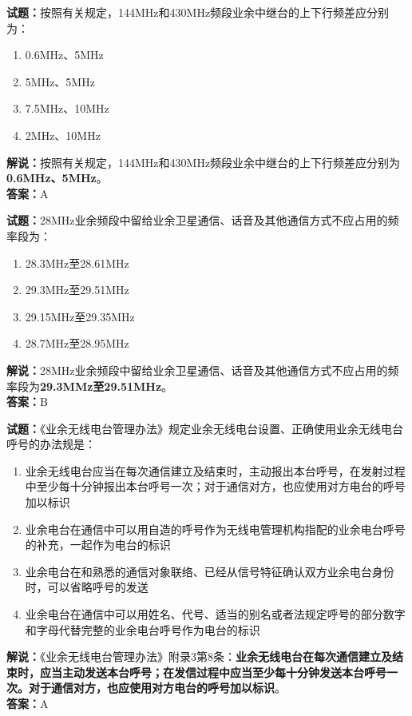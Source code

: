 \documentclass{ctexbook}
\begin{document}
\bigskip


\noindent\textbf{试题：}按照有关规定，144\unit{\MHz}和430\unit{\MHz}频段业余中继台的上下行频差应分别为：
\begin{enumerate}[leftmargin=3em]
\item 0.6\unit{\MHz}、5\unit{\MHz}%
\item 5\unit{\MHz}、5\unit{\MHz}
\item 7.5\unit{\MHz}、10\unit{\MHz}
\item 2\unit{\MHz}、10\unit{\MHz}
\end{enumerate}
\noindent\textbf{解说：}按照有关规定，144\unit{\MHz}和430\unit{\MHz}频段业余中继台的上下行频差应分别为\textbf{0.6\unit{\MHz}、5\unit{\MHz}}。\\\noindent\textbf{答案：}A



\bigskip


\noindent\textbf{试题：}28\unit{\MHz}业余频段中留给业余卫星通信、话音及其他通信方式不应占用的频率段为：
\begin{enumerate}[leftmargin=3em]
\item 28.3\unit{\MHz}至28.61\unit{\MHz}
\item 29.3\unit{\MHz}至29.51\unit{\MHz} %
\item 29.15\unit{\MHz}至29.35\unit{\MHz}
\item 28.7\unit{\MHz}至28.95\unit{\MHz}
\end{enumerate}
\noindent\textbf{解说：}28\unit{\MHz}业余频段中留给业余卫星通信、话音及其他通信方式不应占用的频率段为\textbf{29.3MMz至29.51\unit{\MHz}}。\\\noindent\textbf{答案：}B



\bigskip


\noindent\textbf{试题：}《业余无线电台管理办法》规定业余无线电台设置、正确使用业余无线电台呼号的办法规是：
\begin{enumerate}[leftmargin=3em]
\item 业余无线电台应当在每次通信建立及结束时，主动报出本台呼号，在发射过程中至少每十分钟报出本台呼号一次；对于通信对方，也应使用对方电台的呼号加以标识
\item 业余电台在通信中可以用自造的呼号作为无线电管理机构指配的业余电台呼号的补充，一起作为电台的标识
\item 业余电台在和熟悉的通信对象联络、已经从信号特征确认双方业余电台身份时，可以省略呼号的发送
\item 业余电台在通信中可以用姓名、代号、适当的别名或者法规定呼号的部分数字和字母代替完整的业余电台呼号作为电台的标识
\end{enumerate}
\noindent\textbf{解说：}《业余无线电台管理办法》附录3第8条：\textbf{业余无线电台在每次通信建立及结束时，应当主动发送本台呼号；在发信过程中应当至少每十分钟发送本台呼号一次。对于通信对方，也应使用对方电台的呼号加以标识}。\\\noindent\textbf{答案：}A
\end{document}
